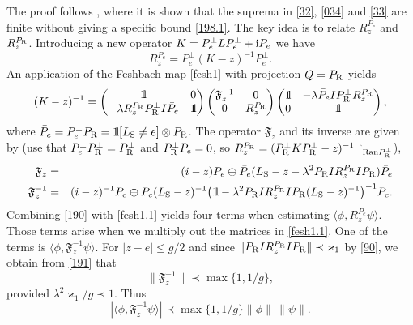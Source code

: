 \documentclass[letterpaper,onecolumn,11pt,accepted=2021-12-09]{quantumarticle}
\numberwithin{equation}{section}
\renewcommand{\r}{{\rm R}}
\newcommand{\s}{{\rm S}}
\renewcommand{\i}{{\rm i}}
\newcommand{\bbbone}{\mathchoice {\rm 1\mskip-4mu l} {\rm 1\mskip-4mu l}
	{\rm 1\mskip-4.5mu l} {\rm 1\mskip-5mu l}}
\begin{document}
The proof follows \cite{KM1}, where it is shown that the suprema in \eqref{32}, \eqref{034} and \eqref{33} are finite without giving a specific bound \eqref{198.1}. The key idea is to relate $R_z^{P_e}$ and $R_z^{P_\r}$. Introducing a new operator $K=P_e^\perp LP^\perp_e+\i P_e$ we have
\begin{equation} 
R_z^{P_e} = P^\perp_e(K-z)^{-1}P_e^\perp.
\label{190}
\end{equation} 
An application of the Feshbach map \eqref{fesh1} with projection $Q=P_\r$ yields
\begin{equation}
(K-z)^{-1} = 
\begin{pmatrix}
\bbbone & 0\\
-\lambda R^{P_\r}_z P_\r^\perp I \bar P_e & \bbbone
\end{pmatrix}
\begin{pmatrix}
{\mathfrak F}_z^{-1} & 0\\
0 & R_z^{P_\r}
\end{pmatrix}
\begin{pmatrix}
\bbbone & -\lambda \bar P_e I P_\r^\perp R_z^{P_\r} \\
0 & \bbbone
\end{pmatrix},
\label{fesh1.1}
\end{equation}
where $\bar P_e = P^\perp_eP_\r =\bbbone[L_\s\neq e]\otimes P_\r$. The operator ${\mathfrak F}_z$ and its inverse are given by (use that $P^\perp_e P^\perp_\r=P^\perp_\r$ and $P_\r^\perp P_e=0$, so $R_z^{P_\r}=(P^\perp_\r K P^\perp_\r -z)^{-1}\upharpoonright_{{\rm Ran} P^\perp_\r}$), 
\begin{eqnarray}
{\mathfrak F}_z &=& (i-z)P_e\oplus \bar P_e (L_\s-z-\lambda^2 P_\r IR_z^{P_\r} IP_\r)\bar P_e \label{191}\\
{\mathfrak F}_z^{-1} &=& (i-z)^{-1}P_e\oplus \bar P_e (L_\s-z)^{-1}\big(\bbbone-\lambda^2 P_\r IR_z^{P_\r} IP_\r (L_\s-z)^{-1}\big)^{-1}\bar P_e.
\end{eqnarray}
Combining \eqref{190} with \eqref{fesh1.1} yields four terms when estimating $\langle\phi, R_z^{P_e}\psi\rangle$. Those terms arise when we multiply out the matrices in \eqref{fesh1.1}. One of the terms is $\langle \phi, {\mathfrak F}_z^{-1} \psi\rangle$. For $|z-e|\le g/2$ and since $\|P_\r IR_z^{P_\r} IP_\r\|\prec \varkappa_1$ by \eqref{90}, we obtain from \eqref{191} that 
\begin{equation}
\| {\mathfrak F}_z^{-1} \| \prec \max\{1,1/g\},
\label{194.1}
\end{equation}
provided $\lambda^2\varkappa_1/g\prec 1$. Thus 
\begin{equation}
|\langle \phi, {\mathfrak F}_z^{-1} \psi\rangle| \prec \max\{1,1/g\} \|\phi\|\, \|\psi\|.
\label{194}
\end{equation} 
\end{document}
